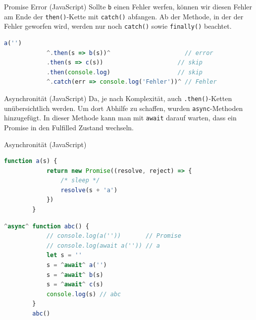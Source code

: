 \begin{example}{Promise Error (JavaScript)}
    Sollte \texttt{b} einen Fehler werfen, können wir diesen Fehler am Ende der \texttt{then()}-Kette mit \texttt{catch()} abfangen.
    Ab der Methode, in der der Fehler geworfen wird, werden nur noch \texttt{catch()} sowie \texttt{finally()} beachtet.

    \begin{lstlisting}[language=JavaScript]
        a('')
            ^.then(s => b(s))^                     // error
            .then(s => c(s))                     // skip
            .then(console.log)                   // skip
            ^.catch(err => console.log('Fehler'))^ // Fehler
    \end{lstlisting}
\end{example}

\begin{defi}{Asynchronität (JavaScript)}
    Da, je nach Komplexität, auch \texttt{.then()}-Ketten unübersichtlich werden.
    Um dort Abhilfe zu schaffen, wurden \texttt{async}-Methoden hinzugefügt.
    In dieser Methode kann man mit \texttt{await} darauf warten, dass ein Promise in den Fulfilled Zustand wechseln.
\end{defi}

\begin{example}{Asynchronität (JavaScript)}
    \begin{lstlisting}[language=JavaScript]
        function a(s) {
            return new Promise((resolve, reject) => {
                /* sleep */
                resolve(s + 'a')
            })
        }
    \end{lstlisting}

    \begin{lstlisting}[language=JavaScript]
        ^async^ function abc() {
            // console.log(a(''))       // Promise
            // console.log(await a('')) // a
            let s = ''
            s = ^await^ a('')
            s = ^await^ b(s)
            s = ^await^ c(s)
            console.log(s) // abc
        }
        abc()
    \end{lstlisting}
\end{example}


